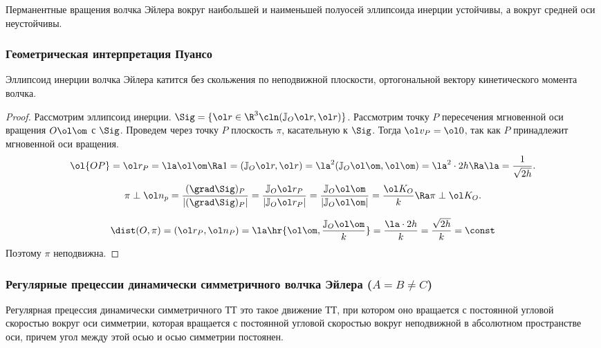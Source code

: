 \documentclass[a4paper,12pt]{article}
\def\w{\ol\om}
\def\n{\ol n}
\def\r{\ol r}
\def\v{\ol v}
\def\K{\ol K_O}
\def\JO{{\mathbb{J}_O}}
\begin{document}
Перманентные вращения волчка Эйлера вокруг наибольшей и наименьшей
полуосей эллипсоида инерции устойчивы, а вокруг средней оси неустойчивы.

\subsubsection{Геометрическая интерпретация Пуансо}

\begin{theorem}
Эллипсоид инерции волчка Эйлера катится без скольжения по неподвижной плоскости,
ортогональной вектору кинетического момента волчка.
\end{theorem}

\begin{proof}
Рассмотрим эллипсоид инерции.
$\Sig=\{\r\in\R^3\cln (\JO\r,\r)\}$. Рассмотрим точку $P$
пересечения мгновенной оси вращения $O\w$ с $\Sig$. Проведем через
точку $P$ плоскость $\pi$, касательную к $\Sig$. Тогда
$\v_P=\ol0$, так как $P$ принадлежит мгновенной оси вращения.
$$
\ol{OP}=\r_P=\la \w \Ra 1=(\JO\r,\r)=\la^2(\JO\w,\w)=\la^2\cdot 2h\Ra\la=\frac1{\sqrt{2h}}.
$$
$$
\pi\perp\n_p=\frac{(\grad\Sig)_P}{|(\grad\Sig)_P|}=\frac{\JO\r_P}{|\JO\r_P|}=
\frac{\JO\w}{|\JO\w|}=\frac{\K}{k}\Ra\pi\perp\K.
$$

$$\dist(O,\pi)=(\r_P,\n_P)=\la\hr{\w,\frac{\JO\w}{k}}=\frac{\la\cdot2h}{k}=\frac{\sqrt{2h}}{k}=\const$$
Поэтому $\pi$ неподвижна.
\end{proof}

\subsubsection{Регулярные прецессии динамически симметричного волчка Эйлера ($A=B\ne C$)}

Регулярная прецессия динамически симметричного ТТ это такое
движение ТТ, при котором оно вращается с постоянной угловой
скоростью вокруг оси симметрии, которая вращается с постоянной
угловой скоростью вокруг неподвижной в абсолютном пространстве оси,
причем угол между этой осью и осью симметрии постоянен.
\end{document}
